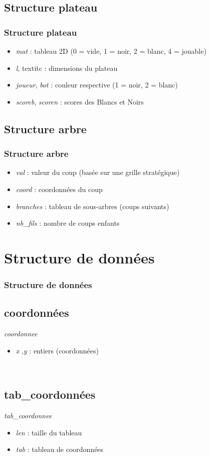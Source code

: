 \documentclass[9pt]{beamer}
\begin{document}
\subsection{Structure plateau}
\begin{frame}
  \frametitle{Structure plateau}
  \begin{itemize}
    \item \textit{mat} : tableau 2D (0 = vide, 1 = noir, 2 = blanc, 4 = jouable)
    \item \textit{l}, textit{c} : dimensions du plateau
    \item \textit{joueur}, \textit{bot} : couleur respective (1 = noir, 2 = blanc)
    \item \textit{scoreb}, \textit{scoren} : scores des Blancs et Noirs
  \end{itemize}
\end{frame}

\subsection{Structure arbre}
\begin{frame}
  \frametitle{Structure arbre}
  \begin{itemize}
    \item \textit{val} :  valeur du coup (basée sur une grille stratégique)
    \item \textit{coord} : coordonnées du coup
    \item \textit{branches} : tableau de sous-arbres (coups suivants)
    \item \textit{nb\_fils} : nombre de coups enfants
  \end{itemize}
\end{frame}

\section{Structure de données}
\begin{frame}
  \frametitle{Structure de données}
  \subsection{coordonnées}
  \textit{coordonnee}
  \begin{itemize}
    \item \textit{x} ,\textit{y} : entiers (coordonnées)
  \end{itemize}

~

  \subsection{tab\_coordonnées}
  \textit{tab\_coordonnee}
  \begin{itemize}
    \item \textit{len} : taille du tableau
    \item \textit{tab} : tableau de coordonnées
  \end{itemize}
\end{frame}
\end{document}
